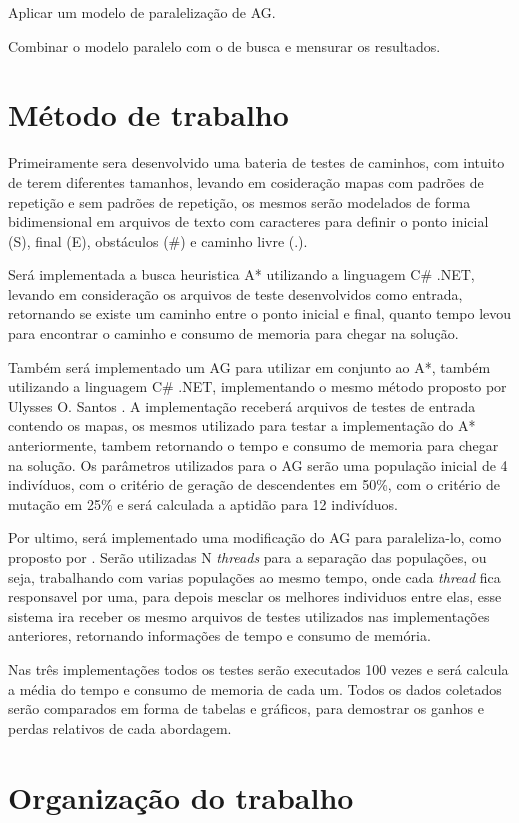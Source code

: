 Aplicar um modelo de paralelização de AG. 

Combinar o modelo paralelo com o de busca e mensurar os resultados.


\section{Método de trabalho}

Primeiramente sera desenvolvido uma bateria de testes de caminhos, com intuito de terem diferentes tamanhos, levando em cosideração mapas com padrões de repetição e sem padrões de repetição, os mesmos serão modelados de forma bidimensional em arquivos de texto com caracteres para definir o ponto inicial (S), final (E), obstáculos (\#) e caminho livre (.).

Será implementada a busca heuristica A* utilizando a linguagem C\# .NET, levando em consideração os arquivos de teste desenvolvidos como entrada, retornando se existe um caminho entre o ponto inicial e final, quanto tempo levou para encontrar o caminho e consumo de memoria para chegar na solução. 

Também será implementado um AG para utilizar em conjunto ao A*, também utilizando a linguagem C\# .NET, implementando o mesmo método proposto por Ulysses O. Santos \cite{Ulysses}. A implementação receberá  arquivos de testes de entrada contendo os mapas, os mesmos  utilizado para testar a implementação do A* anteriormente, tambem retornando o tempo e consumo de memoria para chegar na solução.
Os parâmetros utilizados para o AG serão uma população inicial de 4 indivíduos, com o critério de geração de descendentes em 50\%, com o critério de mutação em 25\% e será calculada a aptidão para 12 indivíduos.

Por ultimo, será implementado uma modificação do AG para paraleliza-lo, como proposto por \cite{Alaoui}. Serão utilizadas N \textit{threads} para a separação das populações, ou seja, trabalhando com varias populações ao mesmo tempo, onde cada \textit{thread} fica responsavel por uma, para depois mesclar os melhores individuos entre elas, esse sistema ira receber os mesmo arquivos de testes utilizados nas implementações anteriores, retornando informações de tempo e consumo de memória.

Nas três implementações todos os testes serão executados 100 vezes e será calcula a média do tempo e consumo de memoria de cada um. Todos os dados coletados serão comparados em forma de tabelas e gráficos, para demostrar os ganhos e perdas relativos de cada abordagem.

\section{Organização do trabalho}


